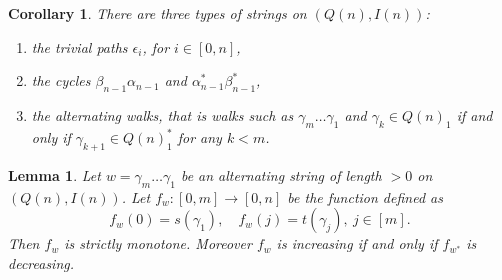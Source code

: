 \documentclass[11pt]{amsart}
\newtheorem{corollary}[theorem]{Corollary}
\newtheorem{lemma}[theorem]{Lemma}
\theoremstyle{definition}
\begin{document}
\begin{corollary}\label{cor : types of strings}
There are three types of strings on  $(Q(n), I(n))$: 
\begin{enumerate}
    \item the trivial paths $\epsilon_i$, for $i\in[0,n]$,
    \item the cycles $\beta_{n-1}\alpha_{n-1}$ and $\alpha_{n-1}^*\beta_{n-1}^*$,
    \item the alternating walks, that is walks such as $\gamma_m\ldots\gamma_1$ and $\gamma_k\in Q(n)_1$ if and only if $\gamma_{k+1}\in Q(n)_1^*$ for any $k<m$.
\end{enumerate}
\end{corollary}

\begin{lemma}\label{lemma : string length 2 alternating}
    Let $w=\gamma_m\ldots\gamma_1$ be an alternating string of length $>0$ on $(Q(n), I(n))$. Let $f_w:[0,m]\to [0,n]$ be the function defined as
    \[ 
    f_w(0)=s(\gamma_1), \quad f_w(j)=t(\gamma_{j}), \ j\in [m].
    \]
    Then $f_w$ is strictly monotone.  Moreover $f_w$ is increasing if and only if $f_{w^*}$ is decreasing.
\end{lemma}



    
\end{document}

